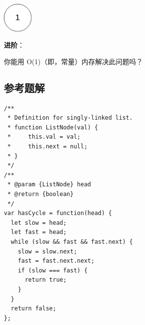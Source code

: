 \includegraphics[width=15mm,height=15mm]{images/leetcode/circularlinkedlist_test3.png}

\textbf{进阶}：

你能用 O(1)（即，常量）内存解决此问题吗？

\subsection{参考题解}

\begin{verbatim}
/**
 * Definition for singly-linked list.
 * function ListNode(val) {
 *     this.val = val;
 *     this.next = null;
 * }
 */
/**
 * @param {ListNode} head
 * @return {boolean}
 */
var hasCycle = function(head) {
  let slow = head;
  let fast = head;
  while (slow && fast && fast.next) {
    slow = slow.next;
    fast = fast.next.next;
    if (slow === fast) {
      return true;
    }
  }
  return false;
};
\end{verbatim}
